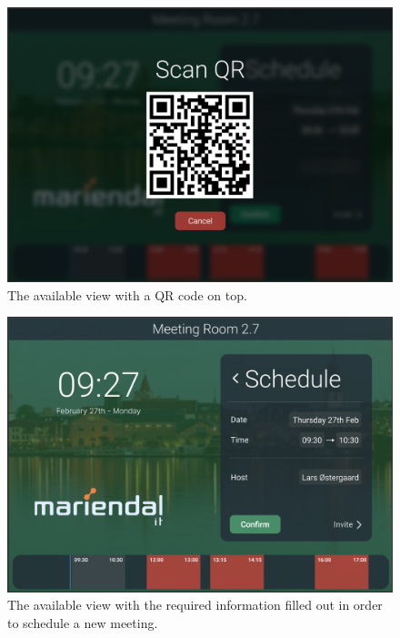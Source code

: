   \begin{figure}[h!]
    \centering
    \includegraphics[width=1\textwidth]{images/available_qr.png}
    \caption{The available view with a QR code on top.}
    \label{fig:available_qr}
  \end{figure}

  \begin{figure}[h!]
    \centering
    \includegraphics[width=1\textwidth]{images/available_host}
    \caption{The available view with the required information filled out in order to schedule a new meeting.}
    \label{fig:available_host}
  \end{figure}

